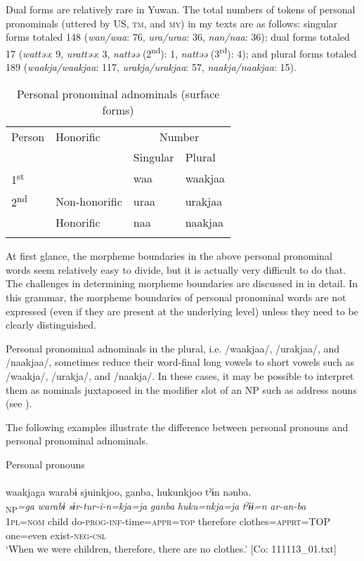 \noindent Dual forms are relatively rare in Yuwan. The total numbers of tokens of personal pronominals (uttered by US, \textsc{tm}, and \textsc{my}) in my texts are as follows: singular forms totaled 148 (\textit{wan/waa}: 76, \textit{ura/uraa}: 36, \textit{nan/naa}: 36); dual forms totaled 17 (\textit{wattəə}: 9, \textit{urattəə}: 3, \textit{nattəə} (2\textsuperscript{nd}): 1, \textit{nattəə} (3\textsuperscript{rd}): 4); and plural forms totaled 189 (\textit{waakja/waakjaa}: 117, \textit{urakja/urakjaa}: 57, \textit{naakja/naakjaa}: 15).

\begin{table}
\caption{\label{tab:key:32}Personal pronominal adnominals (surface forms)}
\begin{tabular}{llll}
\lsptoprule
Person  & Honorific & \multicolumn{2}{c}{Number}\\\cmidrule(lr){3-4}
        &           &    Singular  & Plural\\\midrule
1\textsuperscript{st} & & waa & waakjaa\\
2\textsuperscript{nd} & Non-honorific & uraa & urakjaa\\
                      & Honorific     & naa  & naakjaa\\\lspbottomrule
\end{tabular}
\end{table}

At first glance, the morpheme boundaries in the above personal pronominal words seem relatively easy to divide, but it is actually very difficult to do that. The challenges in determining morpheme boundaries are discussed in  in detail. In this grammar, the morpheme boundaries of personal pronominal words are not expressed (even if they are present at the underlying level) unless they need to be clearly distinguished.

Personal pronominal adnominals in the plural, i.e. /waakjaa/, /urakjaa/, and /naakjaa/, sometimes reduce their word-final long vowels to short vowels such as /waakja/, /urakja/, and /naakja/. In these cases, it may be possible to interpret them as nominals juxtaposed in the modifier slot of an NP such as address nouns (see ).

  The following examples illustrate the difference between personal pronouns and personal pronominal adnominals.

\ea \label{ex:5:1}  \ea \label{ex:5:1a} Personal pronouns\\\\
\glll  waakjaga  warabɨ  sjuinkjoo,  ganba,  hukunkjoo  tˀɨn  nənba.\\
[\textit{waakja}\textsubscript{Head}]\textsubscript{NP}\textit{=ga}  \textit{warabɨ}  \textit{sɨr-tur-i-n=kja=ja}  \textit{ganba} \textit{huku=nkja=ja}  \textit{tˀɨɨ=n}  \textit{ar-an-ba}\\
1\textsc{pl}=\textsc{nom}  child  do-\textsc{prog}-\textsc{inf}-time=\textsc{appr}=\textsc{top}  therefore   clothes=\textsc{apprt}=TOP  one=even  exist-\textsc{neg}-\textsc{csl}\\
\glt ‘When we were children, therefore, there are no clothes.’ [Co: 111113\_01.txt]

